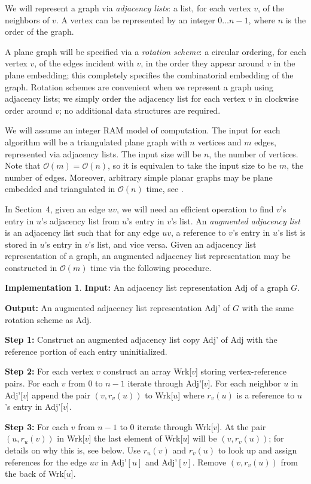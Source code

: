 \documentclass[12pt,letterpaper]{article}
\theoremstyle{plain}
\theoremstyle{definition}
\theoremstyle{break}
\newtheorem{implementation}[lemma]{Implementation}     %
\newcommand{\defterm}[1]{\emph{#1}} %
\begin{document}
We will represent a graph via \textit{adjacency lists}:
a list, for each vertex $v$, of the neighbors of $v$.
A vertex can be represented by an integer $0\dots n-1$,
where $n$ is the order of the graph.

A plane graph will be specified via
a \defterm{rotation scheme}:
a circular ordering,
for each vertex $v$, of the edges incident with $v$,
in the order they appear around $v$ in the plane embedding;
this completely specifies
the combinatorial embedding of the graph.
Rotation schemes are convenient when we represent a graph
using adjacency lists;
we simply order the adjacency
list for each vertex $v$ in clockwise order around $v$;
no additional data structures are required.

We will assume an integer RAM model of computation. The input for each algorithm
will be a triangulated plane graph with $n$ vertices and $m$ edges, represented
via adjacency lists. The input size will be $n$, the number of vertices. Note
that $\mathcal{O}(m)=\mathcal{O}(n)$, so it is equivalen to take the input size
to be $m$, the number of edges. Moreover, arbitrary simple planar graphs may be
plane embedded and triangulated in $\mathcal{O}(n)$ time, see
\cite{BoMy2004}.

In Section~4, given an edge $uv$, we will need an efficient operation to
find $v$'s entry in $u$'s adjacency list from $u$'s entry in $v$'s list.
An \defterm{augmented adjacency list} is an adjacency list such that for
any edge $uv$, a reference to $v$'s entry in
$u$'s list is stored in $u$'s entry in $v$'s list, and vice versa. Given an
adjacency list representation of a graph, an augmented
adjacency list representation may be constructed in $\mathcal{O}(m)$ time via
the following procedure.

\begin{implementation} \label{A:augment}
\textbf{Input:} An adjacency list representation Adj of a graph $G$.

\noindent\textbf{Output:} An augmented adjacency list representation Adj' of $G$
with the same rotation scheme as Adj.

\noindent\textbf{Step 1:} Construct an augmented adjacency list copy Adj' of Adj
with the reference portion of each entry uninitialized.

\noindent\textbf{Step 2:} For each vertex $v$ construct an array Wrk[$v$]
storing vertex-reference pairs. For each $v$ from $0$ to $n-1$ iterate through
Adj'[$v$]. For each neighbor $u$ in Adj'[$v$] append the pair $(v,r_v(u))$ to
Wrk[$u$] where $r_v(u)$ is a reference to $u$'s entry in Adj'[$v$].

\noindent\textbf{Step 3:} For each $v$ from $n-1$ to $0$ iterate through
Wrk[$v$]. At the pair $(u,r_u(v))$ in Wrk[$v$] the last element of
Wrk[$u$] will be $(v,r_v(u))$; for details on why this is, see below. Use
$r_u(v)$ and $r_v(u)$ to look up and assign references for the edge $uv$ in
Adj'$[u]$ and Adj'$[v]$. Remove $(v,r_v(u))$ from the back of Wrk[$u$].
\end{implementation}
\end{document}
